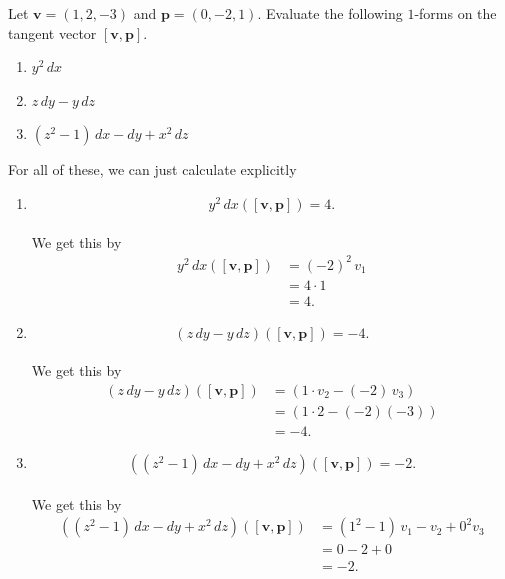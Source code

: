 \documentclass[12 pt, letterpaper]{hmcpset}
\begin{document}
\begin{problem}[Problem 2]
	Let $\mathbf v = (1, 2, -3)$ and $\mathbf p = (0, -2, 1)$. Evaluate the following $1$-forms on the tangent vector $[\mathbf v, \mathbf p]$.
	\begin{enumerate}
		\item $y^2 \, dx$
		\item $z \, dy - y \, dz$
		\item $(z^2 - 1) \, dx - dy + x^2 \, dz$
	\end{enumerate}
\end{problem}

\begin{solution}
	For all of these, we can just calculate explicitly
	\begin{enumerate}
		\item 
			\[
				\boxed{
					y^2 \, dx ([\mathbf v, \mathbf p]) = 4.
				}
			\]\\
			We get this by
			\[
				\begin{split}
					y^2 \, dx([\mathbf v, \mathbf p]) & = (-2)^2 \, v_1 \\
									  & = 4 \cdot 1 \\
									  & = 4.
				\end{split}
			\]
		\item
			\[
				\boxed{
					(z \, dy - y \, dz)([\mathbf v, \mathbf p]) = -4.
				}
			\]\\
			We get this by
			\[
				\begin{split}
					(z \, dy - y \, dz)([\mathbf v, \mathbf p]) & = (1 \cdot v_2 - (-2) \, v_3) \\
										    & = (1 \cdot 2 - (-2)(-3)) \\
										    & = -4.
				\end{split}
			\]
		\item
			\[
				\boxed{
					((z^2 - 1) \, dx - dy + x^2 \, dz)([\mathbf v, \mathbf p]) = -2.
				}
			\]\\
			We get this by
			\[
				\begin{split}
					((z^2 - 1) \, dx - dy + x^2 \, dz)([\mathbf v, \mathbf p]) & = (1^2 - 1) \, v_1 - v_2 + 0^2 v_3 \\
												   & = 0 - 2 + 0 \\
												   & = -2.
				\end{split}
			\]
	\end{enumerate}
\end{solution}

\pagebreak
\end{document}
